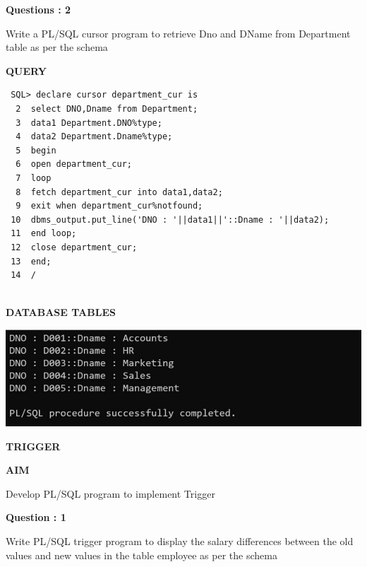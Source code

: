 \documentclass[a4paper,12pt]{report}
\begin{document}
\begin{flushleft}
    \textbf{Questions : 2}
\end{flushleft}
Write a PL/SQL cursor program to retrieve Dno and DName from Department table as per the schema
	\begin{flushleft}
		\textbf{QUERY }
	\end{flushleft}
 \begin{verbatim}
 SQL> declare cursor department_cur is
  2  select DNO,Dname from Department;
  3  data1 Department.DNO%type;
  4  data2 Department.Dname%type;
  5  begin
  6  open department_cur;
  7  loop
  8  fetch department_cur into data1,data2;
  9  exit when department_cur%notfound;
 10  dbms_output.put_line('DNO : '||data1||'::Dname : '||data2);
 11  end loop;
 12  close department_cur;
 13  end;
 14  /


\end{verbatim}
\begin{flushleft}
		\textbf{DATABASE TABLES} 
\end{flushleft} 

\includegraphics[scale=1]{CURSOR3.png}
\newpage
\begin{center}
\large\textbf{TRIGGER}
\end{center}

\begin{flushleft}
\textbf{AIM }
\end{flushleft}
Develop PL/SQL program to implement Trigger

\begin{flushleft}
    \textbf{Question : 1}
\end{flushleft}
Write PL/SQL trigger program to display the salary differences between the old values and new values in the table employee as per the schema
\end{document}
